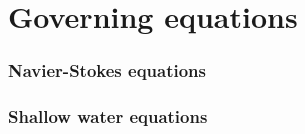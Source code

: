
\chapter{Governing equations}

\subsection{Navier-Stokes equations}


\subsection{Shallow water equations}


